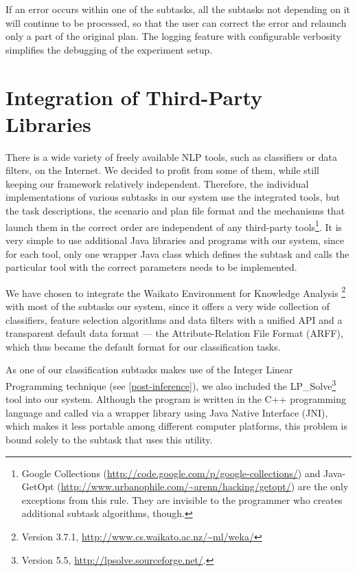 \documentclass[12pt,notitlepage]{report}
\begin{document}
If an error occurs within one of the subtasks, all the subtasks not depending on it will continue to be processed, so that the user can correct the error and relaunch only a part of the original plan. The logging feature with configurable verbosity simplifies the debugging of the experiment setup.

\section{Integration of Third-Party Libraries}\label{weka}

There is a wide variety of freely available NLP tools, such as classifiers or data filters, on the Internet. We decided to profit from some of them, while still keeping our framework relatively independent. Therefore, the individual implementations of various subtasks in our system use the integrated tools, but the task descriptions, the scenario and plan file format and the mechanisms that launch them in the correct order are independent of any third-party tools\footnote{Google Collections (\url{http://code.google.com/p/google-collections/}) and Java-GetOpt (\url{http://www.urbanophile.com/\~arenn/hacking/getopt/}) are the only exceptions from this rule. They are invisible to the programmer who creates additional subtask algorithms, though.}. It is very simple to use additional Java libraries and programs with our system, since for each tool, only one wrapper Java class which defines the subtask and calls the particular tool with the correct parameters needs to be implemented.

We have chosen to integrate the Waikato Environment for Knowledge Analysis \citep[WEKA][]{garner95}\footnote{Version 3.7.1, \url{http://www.cs.waikato.ac.nz/~ml/weka/}} with most of the subtasks our system, since it offers a very wide collection of classifiers, feature selection algorithms and data filters with a unified API and a transparent default data format --- the Attribute-Relation File Format (ARFF), which thus became the default format for our classification tasks.

As one of our classification subtasks makes use of the Integer Linear Programming technique (see \ref{post-inference}), we also included the LP\_Solve\footnote{Version 5.5, \url{http://lpsolve.sourceforge.net/}.} tool into our system. Although the program is written in the C++ programming language and called via a wrapper library using Java Native Interface (JNI), which makes it less portable among different computer platforms, this problem is bound solely to the subtask that uses this utility.
\end{document}
